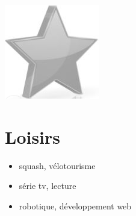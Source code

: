 \documentclass[10pt,a4paper,sans]{article}
\begin{document}
\begin{minipage}[t]{0.28\textwidth}
\begin{mdframed}[style=cadreCompetences]
\begin{itemize}
{                    \includegraphics[scale=0.25]{img/empty_star.png}}
            \end{itemize}

        \section{Loisirs}
            \begin{itemize}
                \item{squash, vélotourisme}
                \item{série tv, lecture}
                \item{robotique, développement web}
            \end{itemize}
    \end{mdframed}
\end{minipage}
\hfill
\end{document}
